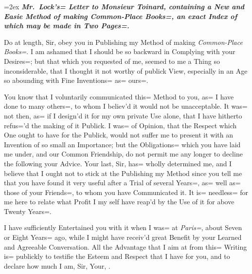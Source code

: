 \clearpage
\newpage
{}
\setcounter{page}{1}
\renewcommand\thepage{\arabic{page}}
\fancyhead{}
\fancyhead[C]{\large(\thepage)}

\hangindent=2ex
{
    \itshape
    \bfseries
    \noindent
    Mr.\ \emph{Lock}'s= Letter to \emph{Monsieur Toinard},
    containing a New and Easie Method of making \emph{Common-Place Books=},
    an exact Index of which may be made in Two Pages=.
}

\settoheight{\dropcapheight}{\usebox{\dropcap}}
\settowidth{\dropcapwidth}{\usebox{\dropcap}}
\nointerlineskip
\smash{\raisebox%
    {-\dimexpr \dropcapheight+0.6\thefontsize\relax}%
    {\noindent\usebox{\dropcap}}}%

\setlength{\shapeindent}{\dimexpr \dropcapwidth+1em\relax}
\setlength{\shapelength}{\textwidth}
\addtolength{\shapelength}{-\shapeindent}
\shapeindent \shapelength
\shapeindent \shapelength
0pt \textwidth
\noindent
\begin{linenumbers}
    Do at length, Sir, obey you in Publishing my Method of making \emph{Common-Place Books=}.
    I am ashamed that I should be so backward in Complying with your Desires=;
    but that which you requested of me,
    seemed to me a Thing so inconsiderable,
    that I thought it not worthy of publick View,
    especially in an Age so abounding with Fine Inventions= as= ours=.

    You know that I voluntarily communicated this= Method to you,
    as= I have done to many others=,
    to whom I believ'd it would not be unacceptable.
    It was= not then,
    as= if I design'd it for my own private Use alone,
    that I have hitherto refus='d the making of it Publick.
    I was= of Opinion, that the Respect which One ought to have for the Publick,
    would not suffer me to present it with an Invention of so small an Importance;
    but the Obligations= which you have laid me under,
    and our Common Friendship,
    do not permit me any longer to decline the following your Advice.
    Your last, Sir, has= wholly determined me,
    and I believe that I ought not to stick at the Publishing my Method since you tell me that you have found it very useful after a Trial of several Years=,
    as= well as= those of your Friends=,
    to whom you have Communicated it.
    It is= needless= for me here to relate what Profit I my self have reap'd by the Use of it for above Twenty Years=.

    I have sufficiently Entertained you with it when I was= at \emph{Paris=},
    about Seven or Eight Years= ago,
    while I might have receiv'd great Benefit by your Learned and Agreeable Conversation.
    All the Advantage that I aim at from this= Writing is= publickly to testifie the Esteem and Respect that I have for you,
    and to declare how much I am, Sir, Your, \etc.
\end{linenumbers}
\clearpage
\newpage

